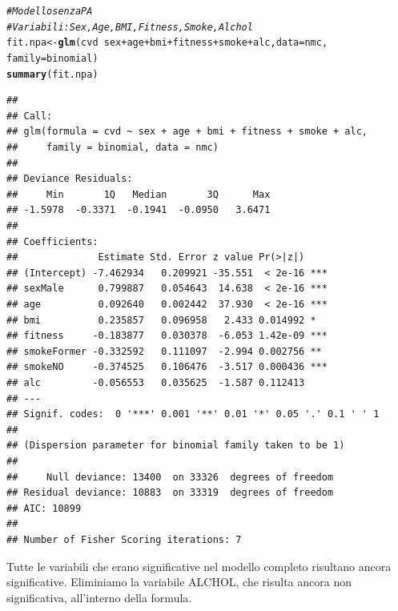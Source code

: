 \documentclass{article}\usepackage[]{graphicx}\usepackage[]{xcolor}
\makeatletter
\newcommand{\hlcom}[1]{\textcolor[rgb]{0.678,0.584,0.686}{\textit{#1}}}%
\newcommand{\hlopt}[1]{\textcolor[rgb]{0,0,0}{#1}}%
\newcommand{\hlstd}[1]{\textcolor[rgb]{0.345,0.345,0.345}{#1}}%
\newcommand{\hlkwb}[1]{\textcolor[rgb]{0.69,0.353,0.396}{#1}}%
\newcommand{\hlkwc}[1]{\textcolor[rgb]{0.333,0.667,0.333}{#1}}%
\newcommand{\hlkwd}[1]{\textcolor[rgb]{0.737,0.353,0.396}{\textbf{#1}}}%
\newenvironment{kframe}{%
 \def\at@end@of@kframe{}%
 \ifinner\ifhmode%
  \def\at@end@of@kframe{\end{minipage}}%
  \begin{minipage}{\columnwidth}%
 \fi\fi%
 \def\FrameCommand##1{\hskip\@totalleftmargin \hskip-\fboxsep
 \colorbox{shadecolor}{##1}\hskip-\fboxsep
     \hskip-\linewidth \hskip-\@totalleftmargin \hskip\columnwidth}%
 \MakeFramed {\advance\hsize-\width
   \@totalleftmargin\z@ \linewidth\hsize
   \@setminipage}}%
 {\par\unskip\endMakeFramed%
 \at@end@of@kframe}
\newenvironment{knitrout}{}{} %
\makeatother
\begin{document}
\begin{knitrout}
\color{fgcolor}\begin{kframe}
\begin{alltt}
\hlcom{#Modello senza PA}
\hlcom{#Variabili: Sex, Age, BMI, Fitness, Smoke, Alchol}
\hlstd{fit.npa} \hlkwb{<-} \hlkwd{glm}\hlstd{(cvd}\hlopt{~}\hlstd{sex}\hlopt{+}\hlstd{age}\hlopt{+}\hlstd{bmi}\hlopt{+}\hlstd{fitness}\hlopt{+}\hlstd{smoke}\hlopt{+}\hlstd{alc,} \hlkwc{data}\hlstd{=nmc,}
               \hlkwc{family}\hlstd{=binomial)}
\hlkwd{summary}\hlstd{(fit.npa)}
\end{alltt}
\begin{verbatim}
## 
## Call:
## glm(formula = cvd ~ sex + age + bmi + fitness + smoke + alc, 
##     family = binomial, data = nmc)
## 
## Deviance Residuals: 
##     Min       1Q   Median       3Q      Max  
## -1.5978  -0.3371  -0.1941  -0.0950   3.6471  
## 
## Coefficients:
##              Estimate Std. Error z value Pr(>|z|)    
## (Intercept) -7.462934   0.209921 -35.551  < 2e-16 ***
## sexMale      0.799887   0.054643  14.638  < 2e-16 ***
## age          0.092640   0.002442  37.930  < 2e-16 ***
## bmi          0.235857   0.096958   2.433 0.014992 *  
## fitness     -0.183877   0.030378  -6.053 1.42e-09 ***
## smokeFormer -0.332592   0.111097  -2.994 0.002756 ** 
## smokeNO     -0.374525   0.106476  -3.517 0.000436 ***
## alc         -0.056553   0.035625  -1.587 0.112413    
## ---
## Signif. codes:  0 '***' 0.001 '**' 0.01 '*' 0.05 '.' 0.1 ' ' 1
## 
## (Dispersion parameter for binomial family taken to be 1)
## 
##     Null deviance: 13400  on 33326  degrees of freedom
## Residual deviance: 10883  on 33319  degrees of freedom
## AIC: 10899
## 
## Number of Fisher Scoring iterations: 7
\end{verbatim}
\end{kframe}
\end{knitrout}
    
    Tutte le variabili che erano significative nel modello completo risultano 
    ancora significative. 
    Eliminiamo la variabile ALCHOL, che risulta ancora non significativa,
    all'interno della formula.
    
\end{document}
